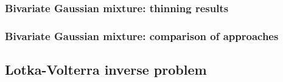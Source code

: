 \documentclass{beamer}
\begin{document}
\begin{frame}
\frametitle{Bivariate Gaussian mixture: thinning results}

\begin{figure}[H]
\centering
{}
\end{figure}

\end{frame}



\begin{frame}
\frametitle{Bivariate Gaussian mixture: comparison of approaches}

\begin{figure}[h]
\centering
{}
\end{figure}

\end{frame}



\subsection{Lotka-Volterra inverse problem}
\end{document}
